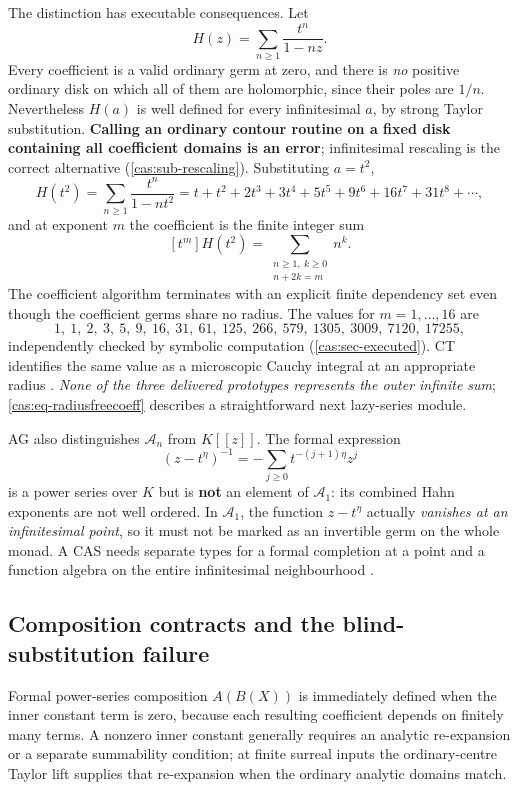 \documentclass[11pt,letterpaper]{article}
\numberwithin{equation}{section}
\theoremstyle{definition}
\theoremstyle{remark}
\newcommand{\Acal}{\mathscr A}
\begin{document}
The distinction has executable consequences. Let
\begin{equation}\label{cas:eq-radiusfree}
 H(z)=\sum_{n\ge1}\frac{t^n}{1-nz}.
\end{equation}
Every coefficient is a valid ordinary germ at zero, and there is \emph{no}
positive ordinary disk on which all of them are holomorphic, since their poles
are $1/n$. Nevertheless $H(a)$ is well defined for every infinitesimal $a$, by
strong Taylor substitution. \textbf{Calling an ordinary contour routine on a
fixed disk containing all coefficient domains is an error}; infinitesimal
rescaling is the correct alternative (\cref{cas:sub-rescaling}). Substituting
$a=t^2$,
\begin{equation}\label{cas:eq-radiusfreesub}
 H(t^2)=\sum_{n\ge1}\frac{t^n}{1-nt^2}
 =t+t^2+2t^3+3t^4+5t^5+9t^6+16t^7+31t^8+\cdots,
\end{equation}
and at exponent $m$ the coefficient is the finite integer sum
\begin{equation}\label{cas:eq-radiusfreecoeff}
 [t^m]H(t^2)=\sum_{\substack{n\ge1,\ k\ge0\\ n+2k=m}}n^k .
\end{equation}
The coefficient algorithm terminates with an explicit finite dependency set even
though the coefficient germs share no radius. The values for $m=1,\dots,16$ are
\[
 1,\ 1,\ 2,\ 3,\ 5,\ 9,\ 16,\ 31,\ 61,\ 125,\ 266,\ 579,\ 1305,\ 3009,\ 7120,\ 17255,
\]
independently checked by symbolic computation (\cref{cas:sec-executed}). CT
identifies the same value as a microscopic Cauchy integral at an appropriate
radius \cite{cas:SourceCT}. \emph{None of the three delivered prototypes
represents the outer infinite sum}; \eqref{cas:eq-radiusfreecoeff} describes a
straightforward next lazy-series module.

AG also distinguishes $\Acal_n$ from $K[[z]]$. The formal expression
\begin{equation}\label{cas:eq-notinA1}
 (z-t^\eta)^{-1}=-\sum_{j\ge0}t^{-(j+1)\eta}z^j
\end{equation}
is a power series over $K$ but is \textbf{not} an element of $\Acal_1$: its
combined Hahn exponents are not well ordered. In $\Acal_1$, the function
$z-t^\eta$ actually \emph{vanishes at an infinitesimal point}, so it must not be
marked as an invertible germ on the whole monad. A CAS needs separate types for
a formal completion at a point and a function algebra on the entire
infinitesimal neighbourhood \cite{cas:SourceAG}.

\subsection{Composition contracts and the blind-substitution failure}
\label{cas:sub-composition}
Formal power-series composition $A(B(X))$ is immediately defined when the inner
constant term is zero, because each resulting coefficient depends on finitely
many terms. A nonzero inner constant generally requires an analytic
re-expansion or a separate summability condition; at finite surreal inputs the
ordinary-centre Taylor lift supplies that re-expansion when the ordinary
analytic domains match.
\end{document}
